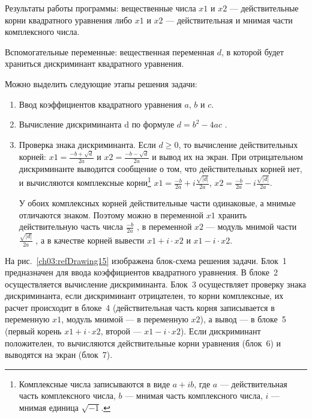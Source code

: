 Результаты работы программы: вещественные числа $x1$ и $x2$ --- действительные корни
квадратного уравнения либо $x1$ и $x2$ --- действительная и мнимая части комплексного
числа.

Вспомогательные переменные: вещественная переменная $d$, в которой будет храниться дискриминант
квадратного уравнения.

Можно выделить следующие этапы решения задачи:
\begin{enumerate}
\item Ввод коэффициентов квадратного уравнения $a$, $b$ и $c$.
\item Вычисление дискриминанта d по формуле  $d=b^2-4ac$ .
\item Проверка знака дискриминанта. Если $d\geqslant 0$, то вычисление действительных корней:
 $x1=\frac{-b+\sqrt{d}}{2a}$  и  $x2=\frac{-b-\sqrt{d}}{2a}$ 
и вывод их на экран. При отрицательном дискриминанте выводится сообщение о том, что действительных корней нет, и
вычисляются комплексные корни\footnote{Комплексные числа записываются в виде
$a+ib$, где $a$ --- действительная часть комплексного числа,
$b$ --- мнимая часть комплексного числа, $i$ --- мнимая единица  $\sqrt{-1}$.}
 $x1=\frac{-b}{2a}+i\frac{\sqrt{\left|{d}\right|}}{2a}$, 
$x2=\frac{-b}{2a}-i\frac{\sqrt{\left|{d}\right|}}{2a}$.

У обоих комплексных корней действительные части одинаковые, а мнимые отличаются знаком. Поэтому можно в переменной
$x1$ хранить действительную часть числа  $\frac{-b}{2a}$ , в переменной $x2$ --- модуль мнимой части 
$\frac{\sqrt{\left|{d}\right|}}{2a}$ , а в качестве корней вывести 
$x1 + i\cdot x2$  и  $x1 - i\cdot x2$. 
\end{enumerate}

На рис.~\ref{ch03:refDrawing15} изображена блок-схема решения задачи. Блок~1 предназначен для ввода коэффициентов квадратного
уравнения. В блоке~2 осуществляется вычисление дискриминанта. Блок~3 осуществляет проверку знака дискриминанта, если
дискриминант отрицателен, то корни комплексные, их расчет происходит в блоке~4 (действительная часть корня записывается
в переменную $x1$, модуль мнимой --- в переменную $x2$), а вывод --- в блоке~5 (первый
корень $x1 + i\cdot x2$, второй --- $x1 - i\cdot x2$). Если дискриминант положителен, то
вычисляются действительные корни уравнения (блок~6) и выводятся на экран (блок~7).

